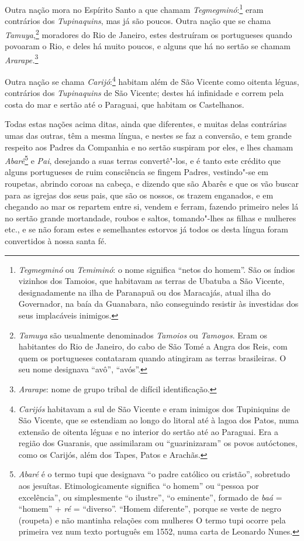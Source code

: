  Outra nação mora no Espírito Santo a que chamam 
\textit{Tegmegminó}:\footnote{ \textit{Tegmegminó} ou \textit{Temiminó}: o nome significa
``netos do homem''. São os índios vizinhos dos Tamoios, que habitavam as
terras de Ubatuba a São Vicente, designadamente na ilha de Paranapuã ou
dos Maracajás, atual ilha do Governador, na baía da Guanabara, não
conseguindo resistir às investidas dos seus implacáveis
inimigos.} eram contrários dos \textit{Tupinaquins}, mas já
são poucos. Outra nação que se chama \textit{Tamuya},\footnote{ \textit{Tamuya} são usualmente denominados \textit{Tamoios} ou
\textit{Tamoyos}. Eram os habitantes do Rio de Janeiro, do cabo de São
Tomé a Angra dos Reis, com quem os portugueses contataram quando
atingiram as terras brasileiras. O seu nome designava ``avô'', ``avós''.}
moradores do Rio de Janeiro, estes destruíram os portugueses
quando povoaram o Rio, e deles há muito poucos, e alguns que há no
sertão se chamam \textit{Ararape.}\footnote{ \textit{Ararape}: nome
de grupo tribal de difícil identificação.} 

 Outra nação se chama \textit{Carijó}:\footnote{ \textit{Carijós} 
habitavam a sul de São Vicente e eram inimigos dos Tupiniquins de São
Vicente, que se estendiam ao longo do litoral até à lagoa dos Patos,
numa extensão de oitenta léguas e no interior do sertão até ao
Paraguai. Era a região dos Guaranis, que assimilaram ou ``guarinizaram''
os povos autóctones, como os Carijós, além dos Tapes, Patos e Arachãs.} 
habitam além de São Vicente como oitenta léguas, contrários dos
\textit{Tupinaquins} de São Vicente; destes há infinidade e correm pela
costa do mar e sertão até o Paraguai, que habitam os Castelhanos. 

 Todas estas nações acima ditas, ainda que diferentes, e muitas delas
contrárias umas das outras, têm a mesma língua, e nestes se faz a
conversão, e tem grande respeito aos Padres da Companhia e no sertão
suspiram por eles, e lhes chamam \textit{Abarê}\footnote{ \textit{Abaré} 
é o termo tupi que designava ``o padre católico ou
cristão'', sobretudo aos jesuítas. Etimologicamente significa ``o homem''
ou ``pessoa por excelência'', ou simplesmente ``o ilustre'', ``o eminente'',
formado de \textit{baá} = ``homem'' + \textit{ré} = ``diverso''. ``Homem
diferente'', porque se veste de negro (roupeta) e não mantinha relações
com mulheres O termo tupi ocorre pela primeira vez num texto português
em 1552, numa carta de Leonardo Nunes.} e\textit{
Pai}, desejando a suas terras convertê"-los, e é tanto este crédito que
alguns portugueses de ruim consciência se fingem Padres, vestindo"-se em
roupetas, abrindo coroas na cabeça, e dizendo que são Abarês e que os
vão buscar para as igrejas dos seus pais, que são os nossos, os trazem
enganados, e em chegando ao mar os repartem entre si, vendem e ferram,
fazendo primeiro neles lá no sertão grande mortandade, roubos e saltos,
tomando"-lhes as filhas e mulheres etc., e se não foram estes e
semelhantes estorvos já todos os desta língua foram convertidos à nossa santa fé.

